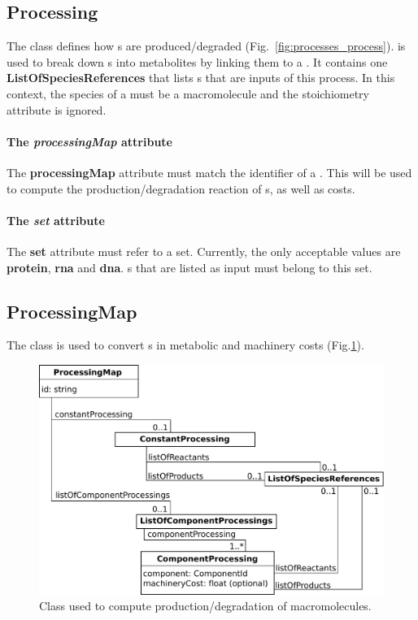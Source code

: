 \subsection{Processing}
\label{sec:processing}

The \processing{} class defines how \macromolecule{}s are produced/degraded
(Fig.~\ref{fig:processes_process}).
\processing{} is used to break down \macromolecule{}s into metabolites
by linking them to a \processingmap.
It contains one \textbf{ListOfSpeciesReferences} that lists \macromolecule{}s
that are inputs of this process.
In this context, the species of a \speciesreference{} must be a macromolecule
and the stoichiometry attribute is ignored.

\paragraph{The \textit{processingMap} attribute}
The \textbf{processingMap} attribute must match the identifier of a
\processingmap.
This \processingmap{} will be used to compute the production/degradation
reaction of \macromolecule{}s, as well as \machinery{} costs.

\paragraph{The \textit{set} attribute}
The \textbf{set} attribute must refer to a \macromolecule{} set.
Currently, the only acceptable values are \textbf{protein}, \textbf{rna}
and \textbf{dna}.
\macromolecule{}s that are listed as input must belong to this set.


\subsection{ProcessingMap}
\label{sec:processing_map}

The \processingmap{} class is used to convert \macromolecule{}s in
metabolic and machinery costs (Fig.\ref{fig:processes_processing_map}).

\begin{figure}
  \centering
  \includegraphics[scale=0.8]{figures/processes_processing_map}
  \caption{Class used to compute production/degradation of macromolecules.}
\label{fig:processes_processing_map}
\end{figure}

